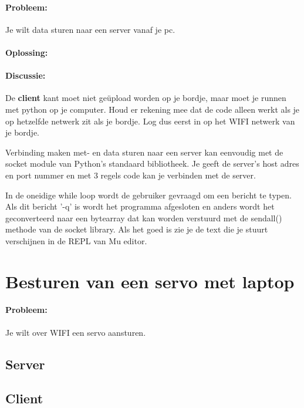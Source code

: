 	\paragraph{Probleem:} Je wilt data sturen naar een server vanaf je pc.
	\paragraph{Oplossing:}
	
	\paragraph{Discussie:} De \textbf{client} kant moet niet ge\"upload worden op je bordje, maar moet je runnen met python op je computer. Houd er rekening mee dat de code alleen werkt als je op hetzelfde netwerk zit als je bordje. Log dus eerst in op het WIFI netwerk van je bordje.
	
	Verbinding maken met- en data sturen naar een server kan eenvoudig met de socket module van Python's standaard bibliotheek. Je geeft de server's host adres en port nummer en met 3 regels code kan je verbinden met de server. 
	
	In de oneidige while loop wordt de gebruiker gevraagd om een bericht te typen. Als dit bericht '-q' is wordt het programma afgesloten en anders wordt het geconverteerd naar een bytearray dat kan worden verstuurd met de sendall() methode van de socket library. Als het goed is zie je de text die je stuurt verschijnen in de REPL van Mu editor.
	


\section{Besturen van een servo met laptop}\label{sec:RCservo}
\paragraph{Probleem:} Je wilt over WIFI een servo aansturen.
\newpage
\subsection{Server}


\subsection{Client}


